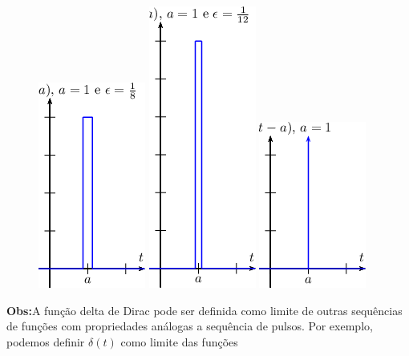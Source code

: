 \documentclass[a4paper,10pt]{book}
\begin{document}
\begin{figure}[!ht]
\begin{center}
 \includegraphics{figs/figura_4}\hspace{20pt}
 \includegraphics{figs/figura_5}\hspace{20pt}
 \includegraphics{figs/figura_6}
 \end{center}
 \caption{\label{fig_delta_dirac}}
 \end{figure}
% 
 {\bf Obs:}A função delta de Dirac pode ser definida como limite de outras sequências de funções com propriedades análogas a sequência de pulsos. Por exemplo, podemos definir $\delta(t)$ como limite das funções
\end{document}
